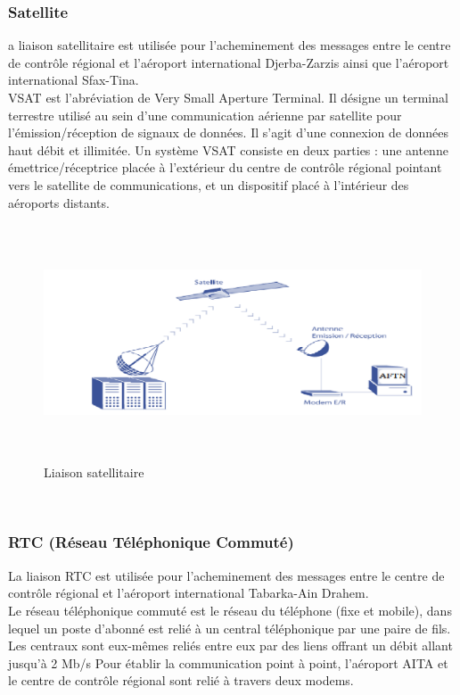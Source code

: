 \subsubsection{Satellite}

a liaison satellitaire est utilisée pour l’acheminement des messages entre le centre de contrôle régional et l’aéroport international Djerba-Zarzis ainsi que l’aéroport international Sfax-Tina. \\
VSAT est l'abréviation de Very Small Aperture Terminal. Il désigne un terminal terrestre utilisé au sein d'une communication aérienne par satellite pour l'émission/réception de signaux de données. Il s'agit d'une connexion de données haut débit et illimitée.
Un système VSAT consiste en deux parties : une antenne émettrice/réceptrice placée à l'extérieur du centre de contrôle régional pointant vers le satellite de communications, et un dispositif placé à l'intérieur des aéroports distants.\\

\begin{figure}[!h]
\begin{center}
\includegraphics[width=14cm,height=7cm]{existant/sate.png}
\end{center}
\caption{Liaison satellitaire}
\end{figure}
~~\\
\subsubsection{RTC (Réseau Téléphonique Commuté)}

La liaison RTC est utilisée pour l’acheminement des messages entre le centre de contrôle régional et l’aéroport international Tabarka-Ain Drahem.\\
Le réseau téléphonique commuté est le réseau du téléphone (fixe et mobile), dans lequel un poste d'abonné est relié à un central téléphonique par une paire de fils. Les centraux sont eux-mêmes reliés entre eux par des liens offrant un débit allant jusqu’à 2 Mb/s Pour établir la communication point à point, l’aéroport AITA et le centre de contrôle régional sont relié à travers deux modems.\\


